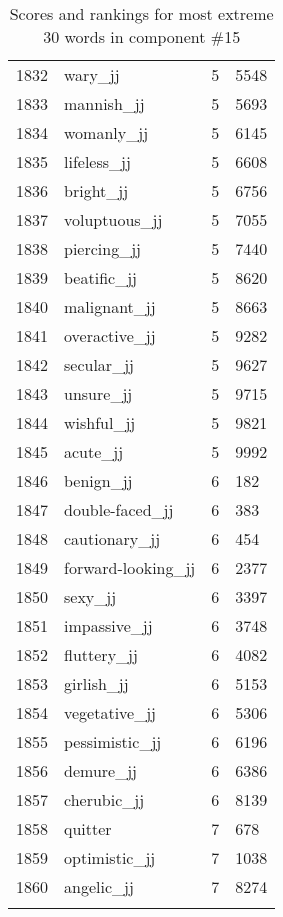 \begin{longtable}[!htbp]{| rlr@{.}l |}
    1832 & wary\_jj & 5 & 5548 \\
    1833 & mannish\_jj & 5 & 5693 \\
    1834 & womanly\_jj & 5 & 6145 \\
    1835 & lifeless\_jj & 5 & 6608 \\
    1836 & bright\_jj & 5 & 6756 \\
    1837 & voluptuous\_jj & 5 & 7055 \\
    1838 & piercing\_jj & 5 & 7440 \\
    1839 & beatific\_jj & 5 & 8620 \\
    1840 & malignant\_jj & 5 & 8663 \\
    1841 & overactive\_jj & 5 & 9282 \\
    1842 & secular\_jj & 5 & 9627 \\
    1843 & unsure\_jj & 5 & 9715 \\
    1844 & wishful\_jj & 5 & 9821 \\
    1845 & acute\_jj & 5 & 9992 \\
    1846 & benign\_jj & 6 & 182 \\
    1847 & double-faced\_jj & 6 & 383 \\
    1848 & cautionary\_jj & 6 & 454 \\
    1849 & forward-looking\_jj & 6 & 2377 \\
    1850 & sexy\_jj & 6 & 3397 \\
    1851 & impassive\_jj & 6 & 3748 \\
    1852 & fluttery\_jj & 6 & 4082 \\
    1853 & girlish\_jj & 6 & 5153 \\
    1854 & vegetative\_jj & 6 & 5306 \\
    1855 & pessimistic\_jj & 6 & 6196 \\
    1856 & demure\_jj & 6 & 6386 \\
    1857 & cherubic\_jj & 6 & 8139 \\
    1858 & quitter & 7 & 678 \\
    1859 & optimistic\_jj & 7 & 1038 \\
    1860 & angelic\_jj & 7 & 8274 \\
    \hline
    \caption{Scores and rankings for most extreme 30 words in component \#15} \\
\end{longtable}
